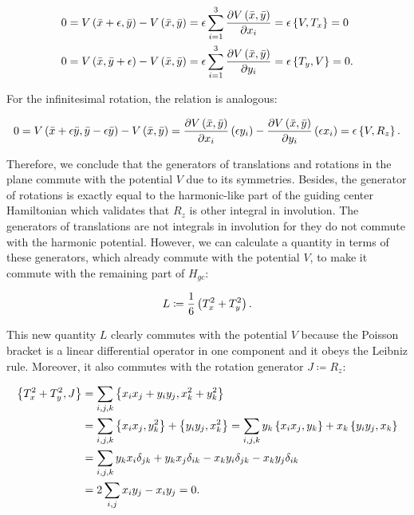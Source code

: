 \begin{align*}
0={V\left( \bar{x}+\epsilon,\bar{y} \right) - V\left( \bar{x},\bar{y} \right)} &= \epsilon \sum_{i = 1}^3 \frac{\partial V\left( \bar{x},\bar{y} \right)}{\partial x_i}  = \epsilon \left\lbrace V, T_x \right\rbrace = 0\\
0={V\left( \bar{x},\bar{y}+\epsilon \right) - V\left( \bar{x},\bar{y} \right)} &= \epsilon \sum_{i = 1}^3 \frac{\partial V\left( \bar{x},\bar{y} \right)}{\partial y_i} = \epsilon \left\lbrace T_y, V \right\rbrace = 0.
\end{align*}

For the infinitesimal rotation, the relation is analogous:

\begin{equation*}
0={V\left( \bar{x} +\epsilon \bar{y}, \bar{y} - \epsilon \bar{y} \right)-V\left( \bar{x},\bar{y} \right)}
= \frac{\partial V\left( \bar{x},\bar{y} \right)}{\partial x_i} \left( \epsilon y_i \right) -                                \frac{\partial V\left( \bar{x},\bar{y} \right)}{\partial y_i} \left( \epsilon x_i \right)                                        = \epsilon \left\lbrace V, R_z \right\rbrace.
\end{equation*}

Therefore, we conclude that the generators of translations and rotations in the plane commute with the potential $V$ due to its symmetries. Besides, the generator of rotations is exactly equal to the harmonic-like part of the guiding center Hamiltonian which validates that $R_z$ is other integral in involution. The generators of translations are not integrals in involution for they do not commute with the harmonic potential. However, we can calculate a quantity in terms of these generators, which already commute with the potential $V$, to make it commute with the remaining part of $H_{gc}$: 

\begin{equation}
L \coloneqq \frac{1}{6}\left( T_x^2 + T_y^2 \right).
\label{eq:gccircle}
\end{equation}

This new quantity $L$ clearly commutes with the potential $V$ because the Poisson bracket is  a linear differential operator in one component and it obeys the Leibniz rule. Moreover, it also commutes with the rotation generator $J \coloneqq R_z$:

\begin{align*}
\left\lbrace T_x^2+ T_y^2,  J \right\rbrace &= \sum_{i,j,k} \left\lbrace x_ix_j + y_iy_j, x_k^2 + y_k^2 \right\rbrace\\
&= \sum_{i,j,k}  \left\lbrace x_ix_j, y_k^2 \right\rbrace + \left\lbrace y_iy_j, x_k^2 \right\rbrace = \sum_{i,j,k} y_k \left\lbrace x_ix_j, y_k \right\rbrace + x_k \left\lbrace y_iy_j, x_k \right\rbrace\\
&= \sum_{i,j,k} y_kx_i\delta_{jk}+y_kx_j\delta_{ik} - x_ky_i\delta_{jk}- x_ky_j\delta_{ik}\\
&= 2\sum_{i,j}x_iy_j-x_iy_j = 0.
\end{align*}

